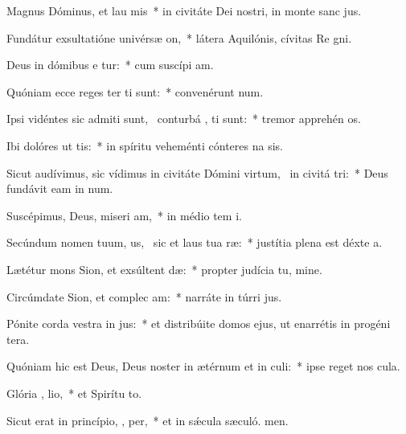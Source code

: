 \item Magnus Dóminus, et lau mis~* in civitáte Dei nostri, in monte sanc jus.
\item Fundátur exsultatióne univérsæ   on,~* látera Aquilónis, cívitas Re gni.
\item Deus in dómibus e tur:~* cum suscípi am.
\item Quóniam ecce reges ter ti sunt:~* convenérunt  num.
\item Ipsi vidéntes sic admiti sunt,~\pscross{} conturbá , ti sunt:~* tremor apprehén os.
\item Ibi dolóres ut tis:~* in spíritu veheménti cónteres na sis.
\item Sicut audívimus, sic vídimus in civitáte Dómini virtum,~\pscross{} in civitá  tri:~* Deus fundávit eam in num.
\item Suscépimus, Deus, miseri am,~* in médio tem i.
\item Secúndum nomen tuum, us,~\pscross{} sic et laus tua   ræ:~* justítia plena est déxte a.
\item Lætétur mons Sion, et exsúltent  dæ:~* propter judícia tu, mine.
\item Circúmdate Sion, et complec am:~* narráte in túrri jus.
\item Pónite corda vestra in  jus:~* et distribúite domos ejus, ut enarrétis in progéni tera.
\item Quóniam hic est Deus, Deus noster in ætérnum et in  culi:~* ipse reget nos  cula.
\item Glória ,  lio,~* et Spirítu to.
\item Sicut erat in princípio,  ,  per,~* et in sǽcula sæculó. men.
